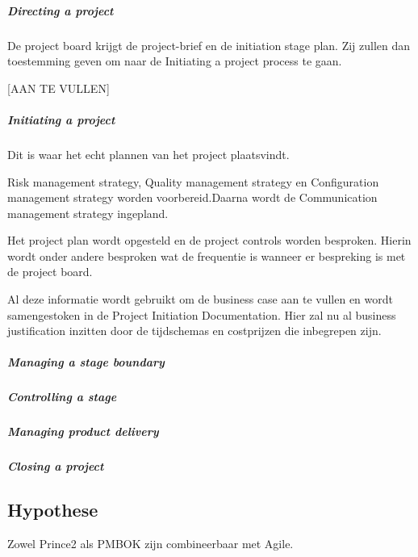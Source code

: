 \documentclass[]{article}
\begin{document}
\subparagraph{Directing a project}
De project board krijgt de project-brief en de initiation stage plan. Zij zullen dan toestemming geven om naar de Initiating a project process te gaan. 

[AAN TE VULLEN]


\subparagraph{Initiating a project}
Dit is waar het echt plannen van het project plaatsvindt.

Risk management strategy, Quality management strategy en Configuration management strategy worden voorbereid.Daarna wordt de Communication management strategy ingepland. 

Het project plan wordt opgesteld en de project controls worden besproken. Hierin wordt onder andere besproken wat de frequentie is wanneer er bespreking is met de project board.

Al deze informatie wordt gebruikt om de business case aan te vullen en wordt samengestoken in de Project Initiation Documentation. Hier zal nu al business justification inzitten door de tijdschemas en costprijzen die inbegrepen zijn.

\subparagraph{Managing a stage boundary}

\subparagraph{Controlling a stage}

\subparagraph{Managing product delivery}

\subparagraph{Closing a project}


\subsection{Hypothese}
Zowel Prince2 als PMBOK zijn combineerbaar met Agile.
\end{document}
